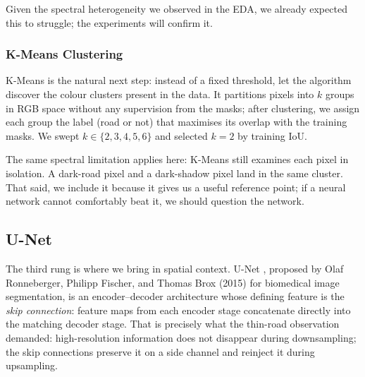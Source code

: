 \documentclass[conference]{IEEEtran}
\begin{document}
Given the spectral heterogeneity we observed in the EDA, we already expected this to struggle;
the experiments will confirm it.

\subsubsection{K-Means Clustering}

K-Means \cite{lloyd1982kmeans} is the natural next step: instead of a fixed threshold, let
the algorithm discover the colour clusters present in the data.
It partitions pixels into $k$ groups in RGB space without any supervision from the masks;
after clustering, we assign each group the label (road or not) that maximises its overlap
with the training masks.
We swept $k \in \{2, 3, 4, 5, 6\}$ and selected $k=2$ by training IoU.

The same spectral limitation applies here: K-Means still examines each pixel in isolation.
A dark-road pixel and a dark-shadow pixel land in the same cluster.
That said, we include it because it gives us a useful reference point; if a neural network
cannot comfortably beat it, we should question the network.

\subsection{U-Net}
\label{sec:unet}

The third rung is where we bring in spatial context.
U-Net \cite{ronneberger2015unet}, proposed by Olaf Ronneberger, Philipp Fischer, and Thomas
Brox (2015) for biomedical image segmentation, is an encoder--decoder architecture whose
defining feature is the \textit{skip connection}: feature maps from each encoder stage
concatenate directly into the matching decoder stage.
That is precisely what the thin-road observation demanded: high-resolution information does
not disappear during downsampling; the skip connections preserve it on a side channel and
reinject it during upsampling.
\end{document}
